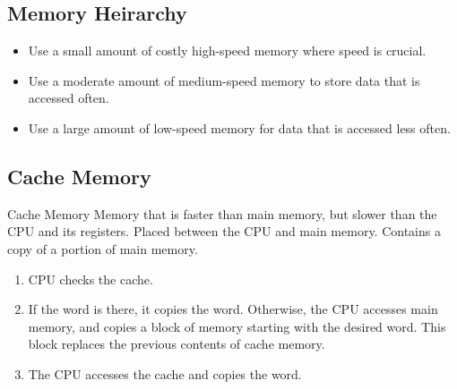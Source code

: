 \documentclass[../notes.tex]{subfiles}
\begin{document}
			\subsection{Memory Heirarchy}
				\begin{center}
				\end{center}
				\begin{itemize}
					\item Use a small amount of costly high-speed memory where speed is crucial.
					\item Use a moderate amount of medium-speed memory to store data that is accessed often.
					\item Use a large amount of low-speed memory for data that is accessed less often.
				\end{itemize}
			\subsection{Cache Memory}
				\begin{definition}{Cache Memory}
					Memory that is faster than main memory, but slower than the CPU and its registers. Placed between the CPU and main memory. Contains a copy of a portion of main memory.
				\end{definition}
				\begin{enumerate}
					\item CPU checks the cache.
					\item If the word is there, it copies the word. Otherwise, the CPU accesses main memory, and copies a block of memory starting with the desired word. This block replaces the previous contents of cache memory.
					\item The CPU accesses the cache and copies the word.
				\end{enumerate}
		\pagebreak
\end{document}

